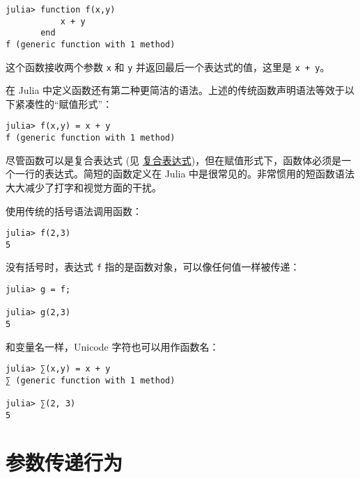 \begin{verbatim}
julia> function f(x,y)
           x + y
       end
f (generic function with 1 method)
\end{verbatim}



这个函数接收两个参数 \texttt{x} 和 \texttt{y} 并返回最后一个表达式的值，这里是 \texttt{x + y}。



在 Julia 中定义函数还有第二种更简洁的语法。上述的传统函数声明语法等效于以下紧凑性的“赋值形式”：




\begin{verbatim}
julia> f(x,y) = x + y
f (generic function with 1 method)
\end{verbatim}



尽管函数可以是复合表达式 (见 \hyperlink{14178955634857450370}{复合表达式})，但在赋值形式下，函数体必须是一个一行的表达式。简短的函数定义在 Julia 中是很常见的。非常惯用的短函数语法大大减少了打字和视觉方面的干扰。



使用传统的括号语法调用函数：




\begin{verbatim}
julia> f(2,3)
5
\end{verbatim}



没有括号时，表达式 \texttt{f} 指的是函数对象，可以像任何值一样被传递：




\begin{verbatim}
julia> g = f;

julia> g(2,3)
5
\end{verbatim}



和变量名一样，Unicode 字符也可以用作函数名：




\begin{verbatim}
julia> ∑(x,y) = x + y
∑ (generic function with 1 method)

julia> ∑(2, 3)
5
\end{verbatim}



\hypertarget{7147748673565495429}{}


\section{参数传递行为}



